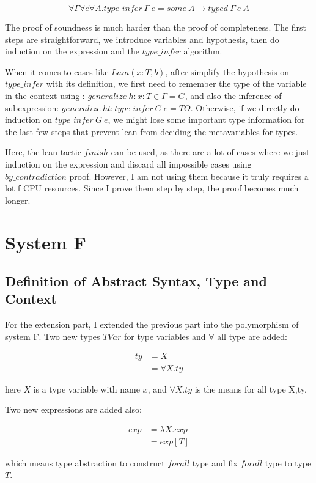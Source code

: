 \documentclass[conference]{IEEEtran}
\begin{document}
\begin{equation}
	\forall \Gamma\forall e\forall A. type\_infer\ \Gamma \ e = some\ A \to typed\ \Gamma\ e\ A
	\label{eq:snd}
\end{equation}

The proof of soundness is much harder than the proof of completeness.
The first steps are straightforward, we introduce variables and hypothesis,
then do induction on the expression and the $type\_infer$ algorithm.

When it comes to cases like $Lam(x:T, b)$, after simplify the hypothesis on
$type\_infer$ with its definition, we first need to remember the type of
the variable in the context using : $generalize\ h:x:T\in\Gamma=G$,
and also the inference of subexpression: $generalize\ ht:type\_infer\ G\ e=TO$.
\cite{pierce2010software}
Otherwise, if we directly do induction on $type\_infer\ G\ e$, we might lose
some important type information for the last few steps that prevent lean from
deciding the metavariables for types.

Here, the lean tactic $finish$ can be used, as there are a lot of cases where we just induction on the expression and discard all impossible cases using $by\_contradiction$ proof. However, I am not using them because it truly requires a lot f CPU resources. Since I prove them step by step, the proof becomes much longer.

\section{System F}
\subsection{Definition of Abstract Syntax, Type and Context}
For the extension part, I extended the previous part into the polymorphism of system F. Two new types $TVar$ for type variables and $\forall$ all type are added:

\begin{equation} \label{FTy}
	\begin{split}
		ty & = X \\
		& = \forall X.ty
	\end{split}
\end{equation}

here $X$ is a type variable with name $x$, and $\forall X.ty$ is the means for all type X,ty.

Two new expressions are added also:

\begin{equation} \label{FExp}
	\begin{split}
		exp & = \lambda X.exp \\
		& = exp[T]
	\end{split}
\end{equation}

which means type abstraction to construct $forall$ type and fix $forall$ type to type $T$.


{}
\end{document}
